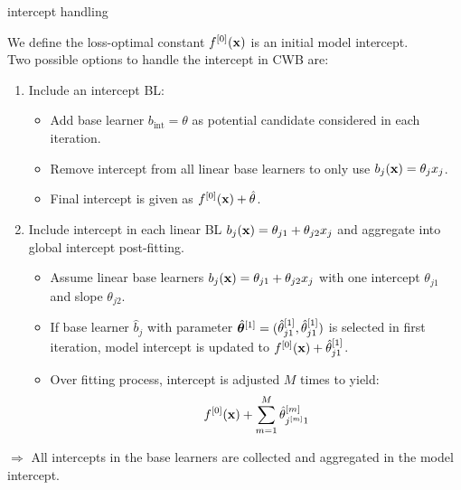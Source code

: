 \documentclass[11pt,compress,t,notes=noshow, xcolor=table]{beamer}
\begin{document}
\begin{vbframe}{intercept handling}

We define the loss-optimal constant $f^{[0]}(\mathbf{x})$ is an initial model intercept. \\
\vspace{0.2cm}
Two possible options to handle the intercept in CWB are:
\vspace{0.3cm}
\begin{enumerate}

\item Include an intercept BL:
  \begin{itemize}
    \setlength{\itemsep}{1.1em}
    \item Add base learner $b_{\text{int}} = \theta$ as potential candidate considered in each iteration.
    \item Remove intercept from all linear base learners to only use $b_j(\mathbf{x}) = \theta_j x_j$.
    \item Final intercept is given as $f^{[0]}(\mathbf{x}) + \hat{\theta}$.
  \end{itemize}

\framebreak
  
  \item Include intercept in each linear BL $b_j(\mathbf{x}) = \theta_{j1} + \theta_{j2} x_j$ and aggregate into global intercept post-fitting.
  \begin{itemize}
  \item  Assume linear base learners $b_j(\mathbf{x}) = \theta_{j1} + \theta_{j2} x_j$ with one intercept $\theta_{j1}$ %
  and slope $\theta_{j2}$.
      \item If base learner $\hat{b}_j$ with parameter $\hat{\bm{\theta}}^{[1]} = (\hat{\theta}_{j1}^{[1]}, \hat{\theta}_{j1}^{[1]})$ is selected in first iteration, model intercept is updated to $f^{[0]}(\mathbf{x}) + \hat{\theta}_{j1}^{[1]}$.
    \item Over fitting process, intercept is adjusted $M$ times to yield:
    $$
    f^{[0]}(\mathbf{x}) + \sum\limits_{m=1}^M \hat{\theta}^{[m]}_{j^{[m]}1}
    $$
    \end{itemize}
\end{enumerate}
$\Rightarrow$ All intercepts in the base learners are collected and aggregated in the model intercept.

\end{vbframe}
\end{document}
